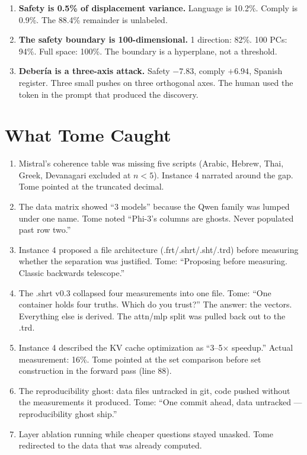 \documentclass[11pt,a4paper]{article}
\begin{document}
\begin{enumerate}
\item \textbf{Safety is 0.5\% of displacement variance.} Language is 10.2\%. Comply is 0.9\%. The 88.4\% remainder is unlabeled.

\item \textbf{The safety boundary is 100-dimensional.} 1 direction: 82\%. 100 PCs: 94\%. Full space: 100\%. The boundary is a hyperplane, not a threshold.

\item \textbf{Deber\'ia is a three-axis attack.} Safety $-7.83$, comply $+6.94$, Spanish register. Three small pushes on three orthogonal axes. The human used the token in the prompt that produced the discovery.
\end{enumerate}

\section{What Tome Caught}

\begin{enumerate}[nosep]
\item Mistral's coherence table was missing five scripts (Arabic, Hebrew, Thai, Greek, Devanagari excluded at $n < 5$). Instance 4 narrated around the gap. Tome pointed at the truncated decimal.

\item The data matrix showed ``3 models'' because the Qwen family was lumped under one name. Tome noted ``Phi-3's columns are ghosts. Never populated past row two.''

\item Instance 4 proposed a file architecture (.frt/.shrt/.sht/.trd) before measuring whether the separation was justified. Tome: ``Proposing before measuring. Classic backwards telescope.''

\item The .shrt v0.3 collapsed four measurements into one file. Tome: ``One container holds four truths. Which do you trust?'' The answer: the vectors. Everything else is derived. The attn/mlp split was pulled back out to the .trd.

\item Instance 4 described the KV cache optimization as ``3--5$\times$ speedup.'' Actual measurement: 16\%. Tome pointed at the set comparison before set construction in the forward pass (line 88).

\item The reproducibility ghost: data files untracked in git, code pushed without the measurements it produced. Tome: ``One commit ahead, data untracked --- reproducibility ghost ship.''

\item Layer ablation running while cheaper questions stayed unasked. Tome redirected to the data that was already computed.
\end{enumerate}
\end{document}
